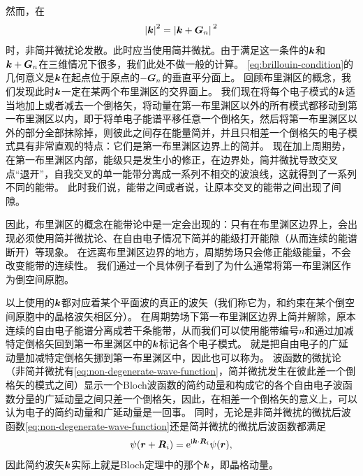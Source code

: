 然而，在
\begin{equation}
    \abs{\vb*{k}}^2 = \abs*{\vb*{k} + \vb*{G}_n}^2
    \label{eq:brillouin-condition}
\end{equation}
时，非简并微扰论发散。此时应当使用简并微扰。由于满足这一条件的$\vb*{k}$和$\vb*{k} + \vb*{G}_n$在三维情况下很多，我们此处不做一般的计算。
\eqref{eq:brillouin-condition}的几何意义是$\vb*{k}$在起点位于原点的$-\vb*{G}_n$的垂直平分面上。
回顾布里渊区的概念，我们发现此时$\vb*{k}$一定在某两个布里渊区的交界面上。
我们现在将每个电子模式的$\vb*{k}$适当地加上或者减去一个倒格矢，将动量在第一布里渊区以外的所有模式都移动到第一布里渊区以内，即于将单电子能谱平移任意一个倒格矢，然后将第一布里渊区以外的部分全部抹除掉，则彼此之间存在能量简并，并且只相差一个倒格矢的电子模式具有非常直观的特点：它们是第一布里渊区边界上的简并。
现在加上周期势，在第一布里渊区内部，能级只是发生小的修正，在边界处，简并微扰导致交叉点“退开”，自我交叉的单一能带分离成一系列不相交的波浪线，这就得到了一系列不同的能带。
此时我们说，能带之间或者说，让原本交叉的能带之间出现了间隙。

因此，布里渊区的概念在能带论中是一定会出现的：只有在布里渊区边界上，会出现必须使用简并微扰论、在自由电子情况下简并的能级打开能隙（从而连续的能谱断开）等现象。
在远离布里渊区边界的地方，周期势场只会修正能级能量，不会改变能带的连续性。
我们通过一个具体例子看到了为什么通常将第一布里渊区作为倒空间原胞。

以上使用的$\vb*{k}$都对应着某个平面波的真正的波矢（我们称它为，和约束在某个倒空间原胞中的晶格波矢相区分）。
在周期势场下第一布里渊区边界上简并解除，原本连续的自由电子能谱分离成若干条能带，从而我们可以使用能带编号$n$和通过加减特定倒格矢回到第一布里渊区中的$\vb*{k}$标记各个电子模式。
就是把自由电子的广延动量加减特定倒格矢挪到第一布里渊区中，因此也可以称为。
波函数的微扰论（非简并微扰有\eqref{eq:non-degenerate-wave-function}，简并微扰发生在彼此差一个倒格矢的模式之间）显示一个Bloch波函数的简约动量和构成它的各个自由电子波函数分量的广延动量之间只差一个倒格矢，因此，在相差一个倒格矢的意义上，可以认为电子的简约动量和广延动量是一回事。
同时，无论是非简并微扰的微扰后波函数\eqref{eq:non-degenerate-wave-function}还是简并微扰的微扰后波函数都满足
\[
    \psi(\vb*{r} + \vb*{R}_i) = \mathrm{e}^{\mathrm{i} \vb*{k} \cdot \vb*{R}_i} \psi(\vb*{r}),
\]
因此简约波矢$\vb*{k}$实际上就是Bloch定理中的那个$\vb*{k}$，即晶格动量。

